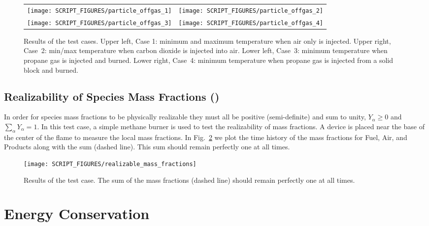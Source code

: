 \documentclass[11pt]{book}
\begin{document}
\begin{figure}[!ht]
\begin{tabular*}{\textwidth}{lr}
\texttt{[image: SCRIPT\_FIGURES/particle\_offgas\_1]} &
\texttt{[image: SCRIPT\_FIGURES/particle\_offgas\_2]} \\
\texttt{[image: SCRIPT\_FIGURES/particle\_offgas\_3]} &
\texttt{[image: SCRIPT\_FIGURES/particle\_offgas\_4]}
\end{tabular*}
\caption[The  test cases]{Results of the  test cases. Upper left, Case 1: minimum and maximum temperature when air only is injected. Upper right, Case~2: min/max temperature when carbon dioxide is injected into air. Lower left, Case~3: minimum temperature when propane gas is injected and burned. Lower right, Case~4: minimum temperature when propane gas is injected from a solid block and burned. }
\label{particle_offgas_plots}
\end{figure}


\subsection{Realizability of Species Mass Fractions (\texorpdfstring{}{realizable\_mass\_fractions})}
\label{realizable_mass_fractions}

In order for species mass fractions to be physically realizable they must all be positive (semi-definite) and sum to unity, $Y_\alpha\ge0$ and $\sum_\alpha Y_\alpha=1$.  In this test case, a simple methane burner is used to test the realizability of mass fractions.  A device is placed near the base of the center of the flame to measure the local mass fractions.  In Fig.~\ref{fig:realizable_mass_fractions} we plot the time history of the mass fractions for Fuel, Air, and Products along with the sum (dashed line).  This sum should remain perfectly one at all times.
\begin{figure}[ht]
\centering
\texttt{[image: SCRIPT\_FIGURES/realizable\_mass\_fractions]}
\caption[The  test case]{Results of the  test case.  The sum of the mass fractions (dashed line) should remain perfectly one at all times.}
\label{fig:realizable_mass_fractions}
\end{figure}




\section{Energy Conservation}
\end{document}
